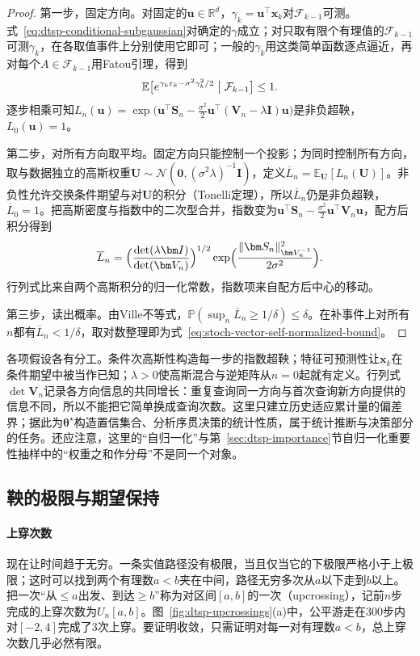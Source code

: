 \begin{proof}
第一步，固定方向。对固定的$\bm u\in\mathbb R^d$，$\gamma_k=\bm u^{\top}\bm x_k$对$\mathcal F_{k-1}$可测。式~\eqref{eq:dtsp-conditional-subgaussian}对确定的$\gamma$成立；对只取有限个有理值的$\mathcal F_{k-1}$可测$\gamma_k$，在各取值事件上分别使用它即可；一般的$\gamma_k$用这类简单函数逐点逼近，再对每个$A\in\mathcal F_{k-1}$用Fatou引理，得到
\[
  \mathbb E\bigl[e^{\gamma_k\varepsilon_k-\sigma^2\gamma_k^2/2}\bigm|\mathcal F_{k-1}\bigr]\leq1.
\]
逐步相乘可知$L_n(\bm u)=\exp\bigl(\bm u^{\top}\bm S_n-\frac{\sigma^2}{2}\bm u^{\top}(\bm V_n-\lambda\bm I)\bm u\bigr)$是非负超鞅，$L_0(\bm u)=1$。

第二步，对所有方向取平均。固定方向只能控制一个投影；为同时控制所有方向，取与数据独立的高斯权重$\bm U\sim\mathcal N(\bm 0,(\sigma^2\lambda)^{-1}\bm I)$，定义$\overline L_n=\mathbb E_{\bm U}[L_n(\bm U)]$。非负性允许交换条件期望与对$\bm U$的积分（Tonelli定理），所以$\overline L_n$仍是非负超鞅，$\overline L_0=1$。把高斯密度与指数中的二次型合并，指数变为$\bm u^{\top}\bm S_n-\frac{\sigma^2}{2}\bm u^{\top}\bm V_n\bm u$，配方后积分得到
\[
  \overline L_n=\Bigl(\frac{\det(\lambda\bm I)}{\det(\bm V_n)}\Bigr)^{1/2}\exp\Bigl(\frac{\lVert\bm S_n\rVert_{\bm V_n^{-1}}^2}{2\sigma^2}\Bigr).
\]
行列式比来自两个高斯积分的归一化常数，指数项来自配方后中心的移动。

第三步，读出概率。由Ville不等式，$\mathbb P(\sup_n\overline L_n\geq1/\delta)\leq\delta$。在补事件上对所有$n$都有$\overline L_n<1/\delta$，取对数整理即为式~\eqref{eq:stoch-vector-self-normalized-bound}。
\end{proof}

各项假设各有分工。条件次高斯性构造每一步的指数超鞅；特征可预测性让$\bm x_k$在条件期望中被当作已知；$\lambda>0$使高斯混合与逆矩阵从$n=0$起就有定义。行列式$\det\bm V_n$记录各方向信息的共同增长：重复查询同一方向与首次查询新方向提供的信息不同，所以不能把它简单换成查询次数。这里只建立历史适应累计量的偏差界；据此为$\bm\theta^\star$构造置信集合、分析序贯决策的统计性质，属于统计推断与决策部分的任务。还应注意，这里的“自归一化”与第~\ref{sec:dtsp-importance}节自归一化重要性抽样中的“权重之和作分母”不是同一个对象。

\subsection{鞅的极限与期望保持}
\label{sec:dtsp-martingale-limits}

\paragraph{上穿次数}
现在让时间趋于无穷。一条实值路径没有极限，当且仅当它的下极限严格小于上极限；这时可以找到两个有理数$a<b$夹在中间，路径无穷多次从$a$以下走到$b$以上。把一次“从$\leq a$出发、到达$\geq b$”称为对区间$[a,b]$的一次（upcrossing），记前$n$步完成的上穿次数为$U_n[a,b]$。图~\ref{fig:dtsp-upcrossings}(a)中，公平游走在$300$步内对$[-2,4]$完成了$3$次上穿。要证明收敛，只需证明对每一对有理数$a<b$，总上穿次数几乎必然有限。

